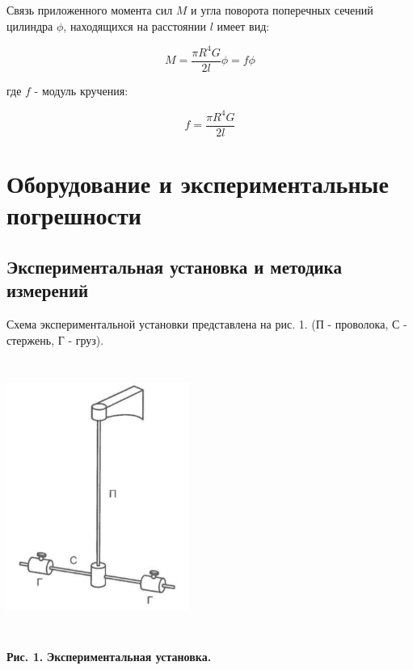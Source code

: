     Связь приложенного момента сил $M$ и угла поворота поперечных сечений цилиндра $\phi$, находящихся на расстоянии $l$ имеет вид:
    
\begin{equation} \label{момент сил}
    M = \frac{\pi R^4 G}{2l}\phi = f\phi
\end{equation}

    где $f$ - модуль кручения:
    
\begin{equation} \label{модуль кручения ф}
    f = \frac{\pi R^4 G}{2l}
\end{equation}



\section{Оборудование и экспериментальные погрешности}


\subsection{Экспериментальная установка и методика измерений}

    Схема экспериментальной установки представлена на рис. 1. (П - проволока, С - стержень, Г - груз).
    
\begin{center}
\includegraphics[width=6cm, height=9cm]{coleb.jpeg}
\end{center}
\begin{flushright}
{\scriptsize \textbf{Рис. 1.} \textbf {Экспериментальная установка.}}
\end{flushright}

